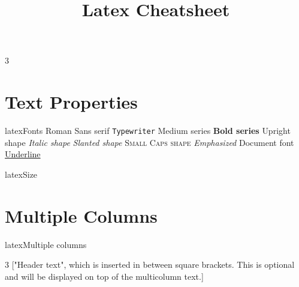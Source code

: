 \documentclass[10pt,a4paper]{article}
\title{\color{w3schools}Latex Cheatsheet
}
\begin{document}
\maketitle
\small
\begin{multicols}{3}

\thispagestyle{empty}
\scriptsize

% 




{\centering\section{Text Properties}}

\begin{codebox}{latex}{Fonts}
\textrm{Roman}
\textsf{Sans serif}
\texttt{Typewriter}
\textmd{Medium series}
\textbf{Bold series}
\textup{Upright shape}
\textit{Italic shape}
\textsl{Slanted shape}
\textsc{Small Caps shape}
\emph{Emphasized}
\textnormal{Document font}
\underline{Underline}

\end{codebox}

\begin{codebox}{latex}{Size}
\tiny \scriptsize \footnotesize \small \normalsize
\large \Large \LARGE \huge \Huge

\end{codebox}

{\centering\section{Multiple Columns}}

\begin{codebox}{latex}{Multiple columns}
\usepackage{multicol}
\setlength{\columnsep}{1cm}
\setlength{\columnseprule}{1pt}
\def\columnseprulecolor{\color{blue}}
\begin{multicols}{3}
["Header text", which is inserted in between square
brackets. This is optional and will be displayed on
top of the multicolumn text.]
\columnbreak
\end{multicols}


\end{codebox}
\end{multicols}
\end{document}
